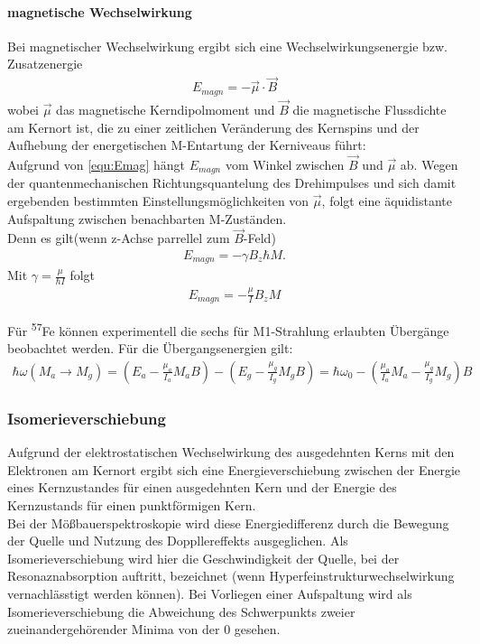 \documentclass[a4paper,twoside,final]{article}
\begin{document}
\paragraph{magnetische Wechselwirkung}
Bei magnetischer Wechselwirkung ergibt sich eine Wechselwirkungsenergie bzw. Zusatzenergie
\begin{align}\label{equ:Emag}
E_{magn} = - \vec{\mu}\cdot\vec{B}
\end{align}
wobei $\vec{\mu}$ das magnetische Kerndipolmoment und $\vec{B}$ die magnetische Flussdichte am Kernort ist, die zu einer zeitlichen Veränderung des Kernspins und  der Aufhebung der energetischen M-Entartung der Kerniveaus führt:\\
Aufgrund von \ref{equ:Emag} hängt $E_{magn}$ vom Winkel zwischen $\vec{B}$ und $\vec{\mu}$ ab. Wegen der quantenmechanischen Richtungsquantelung des Drehimpulses und sich damit ergebenden bestimmten Einstellungsmöglichkeiten von $\vec{\mu}$, folgt eine äquidistante Aufspaltung zwischen benachbarten M-Zuständen. \\
Denn es gilt(wenn z-Achse parrellel zum $\vec{B}$-Feld)
\begin{align}
E_{magn} = -\gamma B_z \hbar M .
\end{align}
Mit $\gamma = \frac{\mu}{\hbar I}$ folgt
\begin{align}
E_{magn} = - \frac{\mu}{I} B_z M
\end{align}

Für \textsuperscript{57}Fe können experimentell die sechs für M1-Strahlung erlaubten Übergänge beobachtet werden. Für die Übergangsenergien gilt:
\begin{align}
\hbar\omega (M_a \rightarrow M_g) = \left(E_a - \frac{\mu_a} {I_a} M_a B \right) - \left(E_g - \frac{\mu_g} {I_g} M_g B \right)  = \hbar\omega_0 - \left(\frac{\mu_a }{I_a} M_a - \frac{\mu_g}{I_g} M_g\right) B
\end{align}


\subsubsection{Isomerieverschiebung}
Aufgrund der elektrostatischen Wechselwirkung des ausgedehnten Kerns mit den Elektronen am Kernort ergibt sich eine Energieverschiebung zwischen der Energie eines Kernzustandes für einen ausgedehnten Kern und der Energie des Kernzustands für einen punktförmigen Kern. \\
Bei der Mößbauerspektroskopie wird diese Energiedifferenz durch die Bewegung der Quelle und Nutzung des Doppllereffekts ausgeglichen. Als Isomerieverschiebung wird hier die Geschwindigkeit der Quelle, bei der Resonaznabsorption auftritt, bezeichnet (wenn Hyperfeinstrukturwechselwirkung vernachlässtigt werden können). Bei Vorliegen einer Aufspaltung wird als Isomerieverschiebung die Abweichung des Schwerpunkts zweier zueinandergehörender Minima von der 0 gesehen. \\
\end{document}
